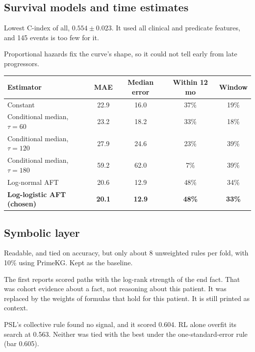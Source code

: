 \documentclass[11pt,a4paper]{article}
\begin{document}
\subsection{Survival models and time estimates}
\begin{dropbox}
Lowest C-index of all, $0.554\pm0.023$. It used all clinical and predicate features, and 145 events is too few for it.
\end{dropbox}
\begin{dropbox}
Proportional hazards fix the curve's shape, so it could not tell early from late progressors.
\begin{center}
\begin{tabular}{lcccc}
\toprule
Estimator & MAE & Median error & Within 12 mo & Window \\
\midrule
Constant & 22.9 & 16.0 & 37\% & 19\% \\
Conditional median, $\tau=60$ & 23.2 & 18.2 & 33\% & 18\% \\
Conditional median, $\tau=120$ & 27.9 & 24.6 & 23\% & 39\% \\
Conditional median, $\tau=180$ & 59.2 & 62.0 & 7\% & 39\% \\
Log-normal AFT & 20.6 & 12.9 & 48\% & 34\% \\
\textbf{Log-logistic AFT (chosen)} & \textbf{20.1} & \textbf{12.9} & \textbf{48\%} & \textbf{33\%} \\
\bottomrule
\end{tabular}
\end{center}
\end{dropbox}

\subsection{Symbolic layer}
\begin{dropbox}
Readable, and tied on accuracy, but only about 8 unweighted rules per fold, with 10\% using PrimeKG. Kept as the baseline.
\end{dropbox}
\begin{dropbox}
The first reports scored paths with the log-rank strength of the end fact. That was cohort evidence about a fact, not reasoning about this patient. It was replaced by the weights of formulas that hold for this patient. It is still printed as context.
\end{dropbox}
\begin{dropbox}
PSL's collective rule found no signal, and it scored 0.604. RL alone overfit its search at 0.563. Neither was tied with the best under the one-standard-error rule (bar 0.605).
\end{dropbox}
\end{document}
